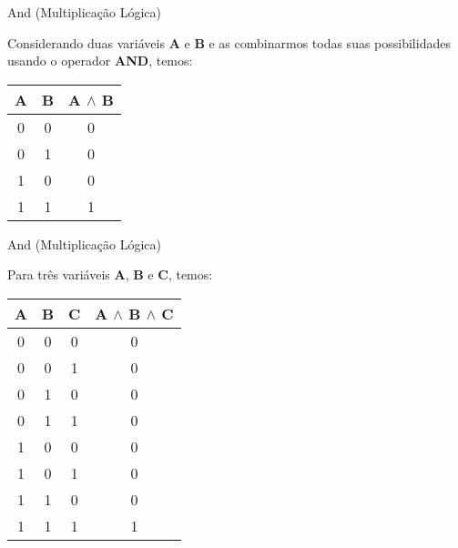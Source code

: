 \begin{frame}{And (Multiplicação Lógica)} 
	

	Considerando duas variáveis \textbf{A} e \textbf{B} e as combinarmos todas suas possibilidades usando o operador \textbf{AND}, temos:
	\center
		
		\begin{tabular}{|c|c|c|} \hline 
			\textbf{A} & \textbf{B} & \textbf{A $\wedge$ B} \\ \hline 
			0 & 0 & 0 \\ \hline 
			0 & 1 & 0 \\ \hline 
			1 & 0 & 0 \\ \hline 
			1 & 1 & 1 \\ \hline 
		\end{tabular} 

\end{frame}


\begin{frame}{And (Multiplicação Lógica)} 

	Para três variáveis \textbf{A}, \textbf{B} e \textbf{C}, temos:
	\center
		
		\begin{tabular}{|c|c|c|c|} \hline 
			\textbf{A} & \textbf{B} & \textbf{C} & \textbf{A $\wedge$ B $\wedge$ C} \\ \hline 
			0 & 0 & 0      & 0 \\ \hline 
			0 & 0 & 1      & 0 \\ \hline 
			0 & 1 & 0      & 0 \\ \hline 
			0 & 1 & 1      & 0 \\ \hline 
			1 & 0 & 0      & 0 \\ \hline 
			1 & 0 & 1      & 0 \\ \hline 
			1 & 1 & 0      & 0 \\ \hline 
			1 & 1 & 1      & 1 \\ \hline 
		\end{tabular} 


\end{frame}

